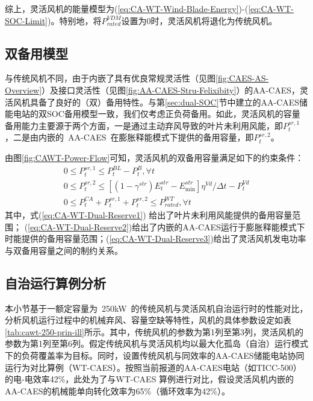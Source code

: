 综上，灵活风机的能量模型为(\ref{eq:CA-WT-Wind-Blade-Energy})-(\ref{eq:CA-WT-SOC-Limit})。特别地，将$P_{rated}^{VDM}$设置为0时，灵活风机将退化为传统风机。

\subsection{双备用模型}
\label{sec:ca-wt-model-reserve}
与传统风机不同，由于内嵌了具有优良常规灵活性（见图\ref{fig:CAES-AS-Overview}）及接口灵活性（见图\ref{fig:AA-CAES-Stru-Felixibity}）的AA-CAES，灵活风机具备了良好的（双）备用特性。与第\ref{sec:dual-SOC}节中建立的AA-CAES储能电站的双SOC备用模型一致，我们仅考虑正负荷备用。如此，灵活风机的容量备用能力主要源于两个方面，一是通过主动弃风导致的叶片未利用风能，即$P_t^{sr,1}$，二是由内嵌的~AA-CAES~在膨胀释能模式下提供的备用容量，即$P_t^{sr,2}$。

由图\ref{fig:CAWT-Power-Flow}可知，灵活风机的双备用容量满足如下的约束条件：
\begin{subequations}
\label{eq:CA-WT-Dual-Reserve}
\begin{gather}
0 \le P_t^{sr,1} \le P_t^{BL} - P_t^B,\forall t \label{eq:CA-WT-Dual-Reserve1}\\
0 \le P_t^{sr,2} \le \left[{(1-\gamma^{str})E_t^{str} - E_{\min }^{str}}\right]{\eta ^{Vd}}/{\Delta t} - P_t^{Vd}\label{eq:CA-WT-Dual-Reserve2}\\
0 \le P_t^{CA} + P_t^{sr,1} + P_t^{sr,2} \le P_{rated}^{WT},\forall t\label{eq:CA-WT-Dual-Reserve3}
\end{gather}
\end{subequations}
其中，式(\ref{eq:CA-WT-Dual-Reserve1}) 给出了叶片未利用风能提供的备用容量范围； (\ref{eq:CA-WT-Dual-Reserve2})给出了内嵌的AA-CAES运行于膨胀释能模式下时能提供的备用容量范围；(\ref{eq:CA-WT-Dual-Reserve3})给出了灵活风机发电功率与双备用容量之间的制约关系。

\subsection{自治运行算例分析}
本小节基于一额定容量为~250kW~的传统风机与灵活风机自治运行时的性能对比，分析风机运行过程中的机械弃风、容量空缺等特性，风机的具体参数设定如表\ref{tab:cawt-250-prin-ill}所示。其中，传统风机的参数为第1列至第3列，灵活风机的参数为第1列至第6列。假定传统风机与灵活风机均以最大化孤岛（自治）运行模式下的负荷覆盖率为目标。同时，设置传统风机与同效率的AA-CAES储能电站协同运行为对比算例（WT-CAES）。按照当前报道的AA-CAES电站（如TICC-500\cite{TICC-15}）的电-电效率42\%，此处为了与WT-CAES 算例进行对比，假设灵活风机内嵌的AA-CAES的机械能单向转化效率为65\%（循环效率为42\%）。

